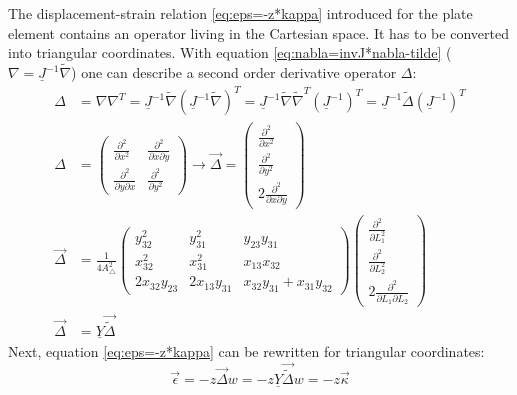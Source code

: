   The displacement-strain relation \ref{eq:eps=-z*kappa} introduced for the plate element contains an operator living in the Cartesian space. It has to be converted into triangular coordinates. With equation \ref{eq:nabla=invJ*nabla-tilde} ($\nabla = \underline{J}^{-1}\tilde{\nabla}$) one can describe a second order derivative operator $\Delta$:
  \begin{align}
  \Delta &= \nabla \nabla^T = \underline{J}^{-1}\tilde{\nabla}\left(\underline{J}^{-1}\tilde{\nabla}\right)^T = \underline{J}^{-1} \tilde{\nabla} \tilde{\nabla}^T \left(\underline{J}^{-1}\right)^T = \underline{J}^{-1} \tilde{\Delta} \left(\underline{J}^{-1}\right)^T\\
  \Delta &= \begin{pmatrix}
  \frac{\partial^2}{\partial x^2} & \frac{\partial^2}{\partial x \partial y}\\
  \frac{\partial^2}{\partial y \partial x} & \frac{\partial^2}{\partial y^2}
  \end{pmatrix} \rightarrow \vec{\Delta} = \begin{pmatrix}
  \frac{\partial^2}{\partial x^2} \\
  \frac{\partial^2}{\partial y^2} \\
  2\frac{\partial^2}{\partial x \partial y}
  \end{pmatrix} \nonumber\\
  \vec{\Delta} &= \frac{1}{4 A_\triangle^2} \begin{pmatrix}
  y_{32}^2 & y_{31}^2 & y_{23} y_{31}\\
  x_{32}^2 & x_{31}^2 & x_{13} x_{32}\\
  2 x_{32} y_{23} & 2 x_{13} y_{31} & x_{32} y_{31} + x_{31} y_{32}
  \end{pmatrix} \begin{pmatrix}
  \frac{\partial^2}{\partial L_1^2} \\
  \frac{\partial^2}{\partial L_2^2} \\
  2\frac{\partial^2}{\partial L_1 \partial L_2}
  \end{pmatrix} \nonumber\\
  \vec{\Delta} &= \underline{Y} \vec{\tilde{\Delta}}
  \end{align}
  Next, equation \ref{eq:eps=-z*kappa} can be rewritten for triangular coordinates:
  \begin{equation}
  \vec{\epsilon} = -z \vec{\Delta} w = -z \underline{Y} \vec{\tilde{\Delta}} w = -z \vec{\kappa}
  \end{equation}
